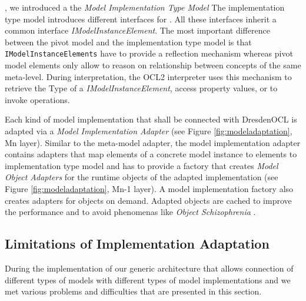 	, we introduced a the \textit{Model Implementation
	Type Model}  The implementation type model introduces different
	interfaces for . All these
	interfaces inherit a common interface \textit{IModelInstanceElement}. The most 
	important difference between the pivot model and the implementation type model
	is that \texttt{IModelInstanceElements} have to provide a reflection mechanism whereas 
	pivot model elements only allow to reason on relationship between concepts of
	the same meta-level. During interpretation, the OCL2 interpreter uses this mechanism to
	retrieve the Type of a \textit{IModelInstanceElement}, access property
	values, or to invoke operations. 
	
	Each kind of model implementation that shall be connected with DresdenOCL is
	adapted via a \textit{Model Implementation Adapter} (see Figure
	\ref{fig:modeladaptation}, Mn layer). Similar to the meta-model adapter, 
	the model implementation adapter contains adapters that map elements of a
	concrete model instance to elements to implementation type model and has to
	provide a factory that creates \textit{Model Object Adapters} for the runtime 
	objects of the adapted implementation  (see Figure \ref{fig:modeladaptation}, Mn-1 layer). 
	A model implementation factory also 
	creates adapters for objects on demand. Adapted objects are cached to
	improve the performance and to avoid phenomenas like \textit{Object
	Schizophrenia} .


\subsection{Limitations of Implementation Adaptation}
	 During the implementation of our
	generic architecture that allows connection of different types of models 
	with different types of model implementations and  we met various problems and
	difficulties that are presented in this section. 

